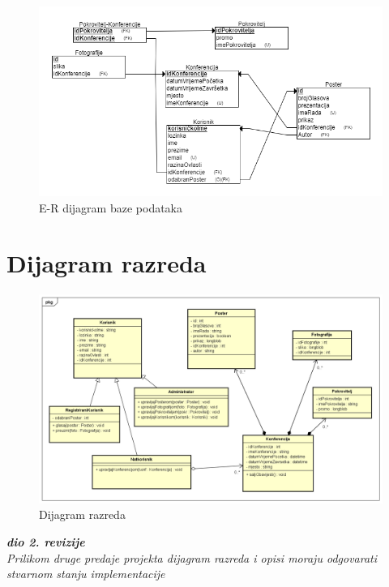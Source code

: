 					\begin{figure} [h]
						\includegraphics[width=\linewidth]{Slike/ERDijagram}
						\caption{E-R dijagram baze podataka}
					\end{figure}
			
			\eject
			
			
		\section{Dijagram razreda}
		
			\begin{figure}
				\includegraphics[width=\linewidth]{Slike/ClassDiagram}
				\caption{Dijagram razreda}
			\end{figure}
			
			\textbf{\textit{dio 2. revizije}}\\			
			
			\textit{Prilikom druge predaje projekta dijagram razreda i opisi moraju odgovarati stvarnom stanju implementacije}
			
			
			
